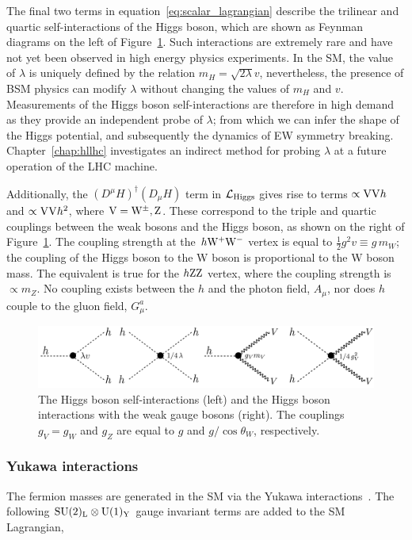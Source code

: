 The final two terms in equation~\ref{eq:scalar_lagrangian} describe the trilinear and quartic self-interactions of the Higgs boson, which are shown as Feynman diagrams on the left of Figure~\ref{fig:feynman_higgs_interactions}. Such interactions are extremely rare and have not yet been observed in high energy physics experiments. In the SM, the value of $\lambda$ is uniquely defined by the relation $m_H=\sqrt{2\lambda}v$, nevertheless, the presence of BSM physics can modify $\lambda$ without changing the values of $m_H$ and $v$. Measurements of the Higgs boson self-interactions are therefore in high demand as they provide an independent probe of $\lambda$; from which we can infer the shape of the Higgs potential, and subsequently the dynamics of EW symmetry breaking. Chapter~\ref{chap:hllhc} investigates an indirect method for probing $\lambda$ at a future operation of the LHC machine.

Additionally, the $(D^\mu H)^{\dagger}(D_\mu H)$ term in $\mathcal{L}_{\rm{Higgs}}$ gives rise to terms $\propto {\rm{VV}}h$ and ${\propto {\rm{VV}}h^2}$, where ${\rm{V}}={\rm{W}}^{\pm},{\rm{Z}}$. These correspond to the triple and quartic couplings between the weak bosons and the Higgs boson, as shown on the right of Figure~\ref{fig:feynman_higgs_interactions}. The coupling strength at the $h{\rm{W^+W^-}}$ vertex is equal to $\frac{1}{2}g^2v \equiv g\,m_W$; the coupling of the Higgs boson to the W boson is proportional to the W boson mass. The equivalent is true for the $h{\rm{ZZ}}$ vertex, where the coupling strength is $\propto m_Z$. No coupling exists between the $h$ and the photon field, $A_\mu$, nor does $h$ couple to the gluon field, $G^a_\mu$.

\begin{figure}[htb!]
  \centering
  \includegraphics[width=.9\linewidth]{Figures/theory/higgs_interaction.pdf}
  \caption[The Higgs boson interactions]
  {
    The Higgs boson self-interactions (left) and the Higgs boson interactions with the weak gauge bosons (right). The couplings $g_V=g_W$ and $g_Z$ are equal to $g$ and $g/\cos{\theta_W}$, respectively.
  }
  \label{fig:feynman_higgs_interactions}
\end{figure}

\subsubsection{Yukawa interactions}
The fermion masses are generated in the SM via the Yukawa interactions~\cite{Thomson:2013zua}. The following ${\rm{SU}(2)_{\rm{L}}}\otimes{\rm{U}}(1)_{\rm{Y}}$ gauge invariant terms are added to the SM Lagrangian,

